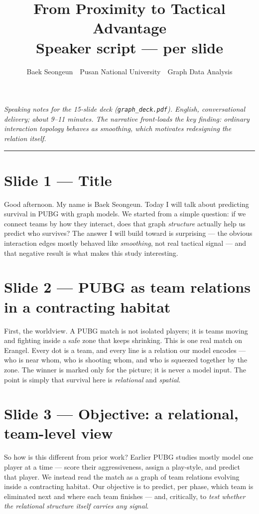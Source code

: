 \documentclass[11pt]{article}
\title{\textbf{From Proximity to Tactical Advantage}\\[2pt]
\large Speaker script --- per slide}
\author{Baek Seongeun \,\textbar\, Pusan National University \,\textbar\, Graph Data Analysis}
\date{}
\begin{document}
\maketitle
\noindent\textit{Speaking notes for the 15-slide deck (\texttt{graph\_deck.pdf}). English, conversational delivery; about 9--11 minutes. The narrative front-loads the key finding: ordinary interaction topology behaves as smoothing, which motivates redesigning the relation itself.}
\vspace{0.5em}\hrule

\section{Slide 1 --- Title}
Good afternoon. My name is Baek Seongeun. Today I will talk about predicting survival in PUBG with graph models. We started from a simple question: if we connect teams by how they interact, does that graph \emph{structure} actually help us predict who survives? The answer I will build toward is surprising --- the obvious interaction edges mostly behaved like \emph{smoothing}, not real tactical signal --- and that negative result is what makes this study interesting.

\section{Slide 2 --- PUBG as team relations in a contracting habitat}
First, the worldview. A PUBG match is not isolated players; it is teams moving and fighting inside a safe zone that keeps shrinking. This is one real match on Erangel. Every dot is a team, and every line is a relation our model encodes --- who is near whom, who is shooting whom, and who is squeezed together by the zone. The winner is marked only for the picture; it is never a model input. The point is simply that survival here is \emph{relational} and \emph{spatial}.

\section{Slide 3 --- Objective: a relational, team-level view}
So how is this different from prior work? Earlier PUBG studies mostly model one player at a time --- score their aggressiveness, assign a play-style, and predict that player. We instead read the match as a graph of team relations evolving inside a contracting habitat. Our objective is to predict, per phase, which team is eliminated next and where each team finishes --- and, critically, to \emph{test whether the relational structure itself carries any signal}.
\end{document}
